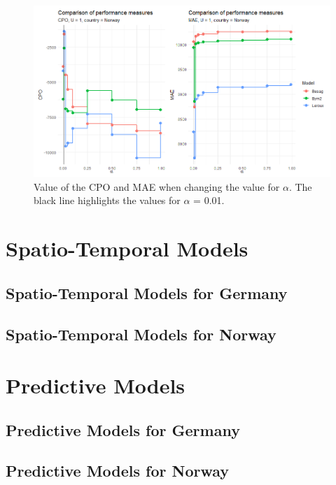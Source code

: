 \begin{figure}[H]
    \centering
    \includegraphics[width = \textwidth]{comparison_4_norway.png}
    \caption{Value of the CPO and MAE when changing the value for $\alpha$. The black line highlights the values for $\alpha$ = 0.01.}
    \label{comparison_norway_4}
\end{figure}
%     

\clearpage
\section{Spatio-Temporal Models}
\subsection{Spatio-Temporal Models for Germany}
\subsection{Spatio-Temporal Models for Norway}
\clearpage
\section{Predictive Models}
\subsection{Predictive Models for Germany}
\subsection{Predictive Models for Norway}